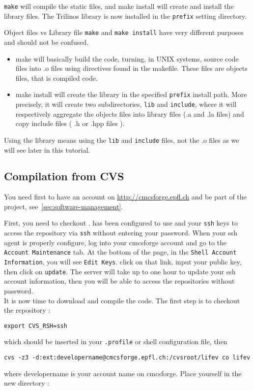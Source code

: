 \verb|make| will compile the static files, and make install will create and install
the library files. The Trilinos library is now installed in the \verb!prefix! setting directory.

\begin{hint}{Object files vs Library file}
\verb|make| and \verb|make install| have very different purposes and should not be confused.
\begin{itemize}
\item make will basically build the code, turning, in UNIX systems, source code
files into .o files using directives found in the makefile. These files are objects files, that is compiled code.
\item make install will create the library in the specified \verb|prefix| install path.
More precisely, it will create two subdirectories, \verb|lib| and \verb|include|, where
it will respectively aggregate the objects files into library files (.a and .la files)
and copy include files ( .h or .hpp files ).
\end{itemize}
Using the library means using the \verb|lib| and \verb|include| files, not the .o files as we will see later
in this tutorial.
\end{hint}


\subsection{Compilation from CVS}
\label{sec:compile-cvs}
You need first to have an account on \url{http://cmcsforge.epfl.ch} and
be part of the \lifev project, see~\ref{sec:software-management}.

\noindent First, you need to checkout \lifev.  has
been configured to use  and your \verb!ssh! keys to
access the repository via \verb!ssh! without entering your password.
When your ssh agent is properly configure, log into your cmcsforge account and
go to the \verb!Account Maintenance! tab. At the bottom of the page, in the
\verb!Shell Account Information!, you will see \verb!Edit Keys!. click on that link,
input your public key, then click on \verb!update!. The server will take up to one
hour to update your ssh account information, then you will be able to access the
repositories without password.\\

It is now time to download and compile the code. The first step is to checkout the repository :

\begin{verbatim}
export CVS_RSH=ssh
\end{verbatim}
which should be inserted in your \verb!.profile! or shell configuration file, then
\begin{verbatim}
cvs -z3 -d:ext:developername@cmcsforge.epfl.ch:/cvsroot/lifev co lifev
\end{verbatim}
where developername is your account name on cmcsforge. Place yourself in the new directory :

